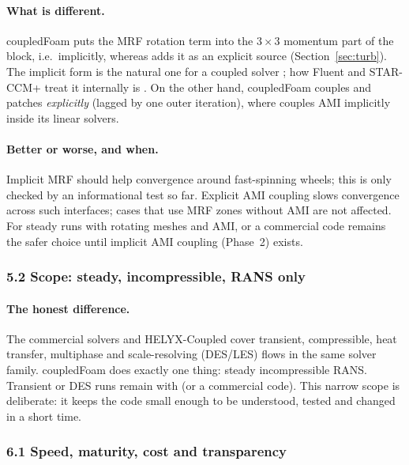 \paragraph{What is different.} coupledFoam puts the MRF rotation term into
the $3\times3$ momentum part of the block, i.e.\ implicitly, whereas
 adds it as an explicit source (Section~\ref{sec:turb}).
The implicit form is the natural one for a coupled solver
\cite{Mangani2014b}; how Fluent and STAR-CCM+ treat it internally is
\cmpnpd. On the other hand, coupledFoam couples  and
 patches \emph{explicitly} (lagged by one outer iteration),
where  couples AMI implicitly inside its linear solvers.

\paragraph{Better or worse, and when.} Implicit MRF should help
convergence around fast-spinning wheels; this is only checked by an
informational test so far. Explicit AMI coupling slows convergence across
such interfaces; cases that use MRF zones without AMI are not affected.
For steady runs with rotating meshes and AMI,  or a
commercial code remains the safer choice until implicit AMI coupling
(Phase~2) exists.

\subsubsection*{5.2 Scope: steady, incompressible, RANS only}

\paragraph{The honest difference.} The commercial solvers and HELYX-Coupled
cover transient, compressible, heat transfer, multiphase and scale-resolving
(DES/LES) flows in the same solver family. coupledFoam does exactly one
thing: steady incompressible RANS. Transient or DES runs remain with
 (or a commercial code). This narrow scope is deliberate:
it keeps the code small enough to be understood, tested and changed in a
short time.

\subsubsection*{6.1 Speed, maturity, cost and transparency}

